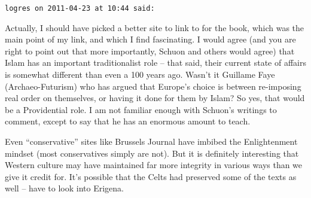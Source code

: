 \begin{footnotesize}
\begin{sffamily}
\hfill

\texttt{logres on 2011-04-23 at 10:44 said:}

Actually, I should have picked a better site to link to for the book, which was the main point of my link, and which I find fascinating. I would agree (and you are right to point out that more importantly, Schuon and others would agree) that Islam has an important traditionalist role -- that said, their current state of affairs is somewhat different than even a 100 years ago. Wasn't it Guillame Faye (Archaeo-Futurism) who has argued that Europe's choice is between re-imposing real order on themselves, or having it done for them by Islam? So yes, that would be a Providential role. I am not familiar enough with Schuon's writings to comment, except to say that he has an enormous amount to teach.

Even ``conservative'' sites like Brussels Journal have imbibed the Enlightenment mindset (most conservatives simply are not). But it is definitely interesting that Western culture may have maintained far more integrity in various ways than we give it credit for. It's possible that the Celts had preserved some of the texts as well -- have to look into Erigena.

\hfill

\end{sffamily}
\end{footnotesize}

